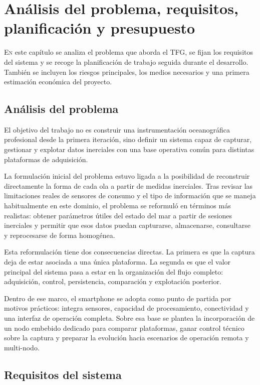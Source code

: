\chapter{Análisis del problema, requisitos, planificación y presupuesto}
\label{chap:metodologia-plan}

\lettrine{E}{n} este capítulo se analiza el problema que aborda el TFG, se fijan los requisitos del sistema y se recoge la planificación de trabajo seguida durante el desarrollo. También se incluyen los riesgos principales, los medios necesarios y una primera estimación económica del proyecto.

\section{Análisis del problema}

El objetivo del trabajo no es construir una instrumentación oceanográfica profesional desde la primera iteración, sino definir un sistema capaz de capturar, gestionar y explotar datos inerciales con una base operativa común para distintas plataformas de adquisición.

La formulación inicial del problema estuvo ligada a la posibilidad de reconstruir directamente la forma de cada ola a partir de medidas inerciales. Tras revisar las limitaciones reales de sensores de consumo y el tipo de información que se maneja habitualmente en este dominio, el problema se reformuló en términos más realistas: obtener parámetros útiles del estado del mar a partir de sesiones inerciales y permitir que esos datos puedan capturarse, almacenarse, consultarse y reprocesarse de forma homogénea.

Esta reformulación tiene dos consecuencias directas. La primera es que la captura deja de estar asociada a una única plataforma. La segunda es que el valor principal del sistema pasa a estar en la organización del flujo completo: adquisición, control, persistencia, comparación y explotación posterior.

Dentro de ese marco, el smartphone se adopta como punto de partida por motivos prácticos: integra sensores, capacidad de procesamiento, conectividad y una interfaz de operación completa. Sobre esa base se plantea la incorporación de un nodo embebido dedicado para comparar plataformas, ganar control técnico sobre la captura y preparar la evolución hacia escenarios de operación remota y multi-nodo.

\section{Requisitos del sistema}

